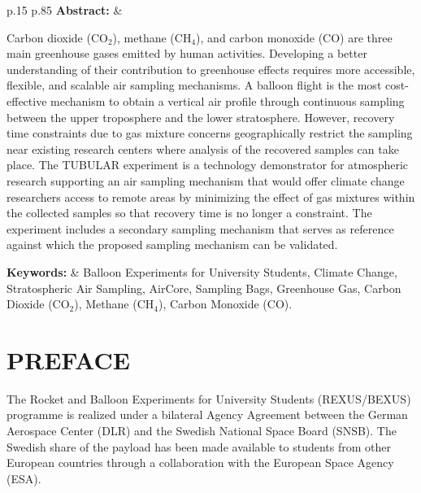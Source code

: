 \documentclass[a4paper,12pt,oneside]{article}
\begin{document}
\vspace{1cm}
\begin{tabular}{p{} p{}}
\textbf{Abstract:}     & 

\newpage
Carbon dioxide (CO$_{2}$), methane (CH$_{4}$), and carbon monoxide (CO) are three main greenhouse gases emitted by human activities. Developing a better understanding of their contribution to greenhouse effects requires more accessible, flexible, and scalable air sampling mechanisms. A balloon flight is the most cost-effective mechanism to obtain a vertical air profile through continuous sampling between the upper troposphere and the lower stratosphere. However, recovery time constraints due to gas mixture concerns geographically restrict the sampling near existing research centers where analysis of the recovered samples can take place. The TUBULAR experiment is a technology demonstrator for atmospheric research supporting an air sampling mechanism that would offer climate change researchers access to remote areas by minimizing the effect of gas mixtures within the collected samples so that recovery time is no longer a constraint. The experiment includes a secondary sampling mechanism that serves as reference against which the proposed sampling mechanism can be validated.

\textbf{Keywords:}     & %
Balloon Experiments for University Students, Climate Change, Stratospheric Air Sampling, AirCore, Sampling Bags, Greenhouse Gas, Carbon Dioxide (CO$_{2}$), Methane (CH$_{4}$), Carbon Monoxide (CO).
\end{tabular}

\vfill

\newpage
\tableofcontents

\newpage
\section*{PREFACE} \markboth{}{}

The Rocket and Balloon Experiments for University Students (REXUS/BEXUS) programme is realized under a bilateral Agency Agreement between the German Aerospace Center (DLR) and the Swedish National Space Board (SNSB). The Swedish share of the
payload has been made available to students from other European countries through a collaboration with the European Space Agency (ESA).
\end{document}
